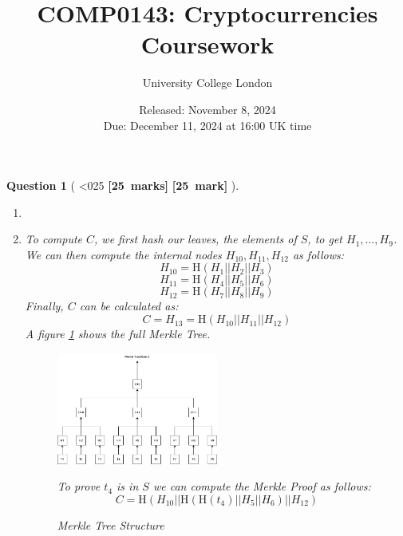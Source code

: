 \documentclass[a4paper]{article}
\theoremstyle{que}
\newtheorem{question}{Question}
\newcommand{\fixoffset}{\mbox{}\vspace*{-\bigskipamount}\vspace*{-\medskipamount}}
\newcommand\points[1]{%
\ifnum1<0#1\relax%
    {\bf \small [#1~marks]}%
  \else%
    {\bf \small [#1~mark]}%
  \fi%
}%
\newcommand{\module}{COMP0143: Cryptocurrencies}
\newcommand{\university}{University College London}
\newcommand{\assessment}{Coursework}
\newcommand{\releaseDate}{November 8, 2024}
\newcommand{\dueDate}{December 11, 2024 at 16:00 UK time}
\begin{document}
\title{\module\\[0.25cm]\assessment}
\author{\university}
\date{Released: \releaseDate\\[0.25cm]Due: \dueDate}
\maketitle

\newpage


\begin{question}[\points{25}]
  \fixoffset
  \begin{enumerate}[label=(\alph*)]
    \item 
    \item[(i)] To compute \( C \), we first hash our leaves, the elements of \( S \), to get \( H_1, \ldots, H_9 \). We can then compute the internal nodes \( H_{10}, H_{11}, H_{12} \) as follows:
\[
H_{10} = \text{H}(H_1 || H_2 || H_3)
\]
\[
H_{11} = \text{H}(H_4 || H_5 || H_6)
\]
\[
H_{12} = \text{H}(H_7 || H_8 || H_9)
\]
Finally, \( C \) can be calculated as:
\[
C = H_{13} = \text{H}(H_{10} || H_{11} || H_{12})
\]
A figure \ref{fig:merkle_tree} shows the full Merkle Tree.
\begin{figure}[h!]
    \centering
    \includegraphics[width=0.5\textwidth]{Merkle Tree example.drawio.png} %
    \caption{Merkle Tree Structure}
    \label{fig:merkle_tree}
To prove \( t_4 \) is in \( S \) we can compute the Merkle Proof as follows:
\[
C = \text{H}(H_{10}||\text{H}(\text{H}(t_4)||H_5||H_6)||H_{12})
\]


\end{figure}
\end{enumerate}
\end{question}
\end{document}
